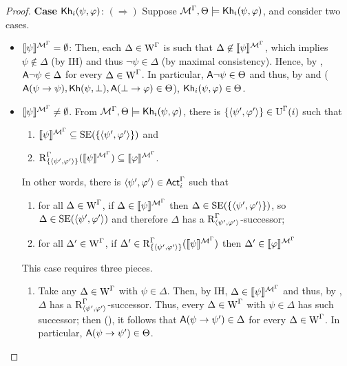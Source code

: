 \begin{proof}
\noindent
\textbf{Case ${\sf Kh}_i(\psi,\varphi)$}: $(\Rightarrow)$ Suppose $\mathcal{M}^\Gamma, \Theta \models {\sf Kh}_i(\psi,\varphi)$, and consider two cases.
\begin{itemize}
\item ${\llbracket \psi \rrbracket^{\mathcal{M}^\Gamma} = \emptyset}$: Then, each $\Delta \in \operatorname{W}^\Gamma$ is such that $\Delta \not\in \llbracket \psi \rrbracket^{\mathcal{M}^\Gamma}$, which implies $\psi \not\in \Delta$ (by IH) and thus $\lnot\psi \in \Delta$ (by maximal consistency).
Hence, by , ${\sf A}\lnot\psi \in \Delta$ for every $\Delta \in \operatorname{W}^\Gamma$. In particular, ${\sf A}\lnot\psi \in \Theta$ and thus, by  and  (${\sf A}(\psi \rightarrow \psi),{\sf Kh}(\psi,\bot),{\sf A}(\bot \rightarrow \varphi) \in \Theta$), ${\sf Kh}_i(\psi, \varphi) \in \Theta$.
\item ${\llbracket \psi \rrbracket^{\mathcal{M}^\Gamma} \neq \emptyset}$.
From $\mathcal{M}^\Gamma, \Theta \models {\sf Kh}_i(\psi,\varphi)$, there is $\{ \langle \psi',\varphi' \rangle \} \in \operatorname{U}^\Gamma(i)$ such that
\begin{enumerate}
\item $\llbracket \psi \rrbracket^{\mathcal{M}^\Gamma} \subseteq \operatorname{SE}(\{ \langle \psi',\varphi' \rangle \})$ and
\item $\operatorname{R}^\Gamma_{\{ \langle \psi',\varphi' \rangle \}}(\llbracket \psi \rrbracket^{\mathcal{M}^\Gamma}) \subseteq \llbracket \varphi \rrbracket^{\mathcal{M}^\Gamma}$.
\end{enumerate}
In other words, there is $\langle \psi',\varphi' \rangle \in {\rm \sf Act}^\Gamma_i$ such that
\begin{enumerate}
    \item\label{tlm:cm-esmiv-stexec-lkhi-itm:i} for all $\Delta \in \operatorname{W}^\Gamma$, if $\Delta \in \llbracket \psi \rrbracket^{\mathcal{M}^\Gamma}$ then $\Delta \in \operatorname{SE}(\{ \langle \psi',\varphi' \rangle \})$, so $\Delta \in \operatorname{SE}(\langle \psi',\varphi' \rangle)$ and therefore $\Delta$ has a $\operatorname{R}^\Gamma_{\langle \psi',\varphi' \rangle}$-successor;
    \item\label{tlm:cm-esmiv-stexec-lkhi-itm:ii} for all $\Delta' \in \operatorname{W}^\Gamma$, if $\Delta' \in \operatorname{R}^\Gamma_{\{ \langle \psi',\varphi' \rangle \}}(\llbracket \psi \rrbracket^{\mathcal{M}^\Gamma})$ then $\Delta' \in \llbracket \varphi \rrbracket^{\mathcal{M}^\Gamma}$
\end{enumerate}
This case requires three pieces.
\begin{enumerate}
    \item Take any $\Delta \in \operatorname{W}^\Gamma$ with $\psi \in \Delta$. Then, by IH, $\Delta \in \llbracket \psi \rrbracket^{\mathcal{M}^\Gamma}$ and thus, by , $\Delta$ has a $\operatorname{R}^\Gamma_{\langle \psi',\varphi' \rangle}$-successor.
    Thus, every $\Delta \in \operatorname{W}^\Gamma$ with $\psi \in \Delta$ has such successor; then (), it follows that ${\sf A}(\psi \rightarrow \psi') \in \Delta$ for every $\Delta \in \operatorname{W}^\Gamma$.
    In particular, ${\sf A}(\psi \rightarrow \psi') \in \Theta$.


\end{enumerate}
\end{itemize}
\end{proof}
